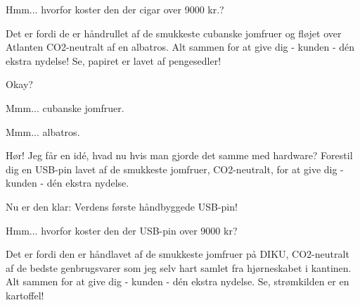 \documentclass[a4paper,11pt]{article}
\begin{document}
\begin{sketch}


 Hmm... hvorfor koster den der cigar over 9000 kr.?

  Det er fordi de er håndrullet af de smukkeste cubanske jomfruer og fløjet over Atlanten CO2-neutralt af en albatros.  Alt sammen for at give dig - kunden - d\'en ekstra nydelse! Se, papiret er lavet af pengesedler!


 Okay?


 Mmm... cubanske jomfruer.


 Mmm... albatros.


  Hør! Jeg får en id\'e,  hvad nu hvis man gjorde det samme med hardware?
 Forestil dig en USB-pin lavet af de smukkeste jomfruer, CO2-neutralt, for at give dig - kunden - d\'en ekstra nydelse.


  Nu er den klar: Verdens første håndbyggede USB-pin!



 Hmm... hvorfor koster den der USB-pin over 9000 kr?

  Det er fordi den er håndlavet af de smukkeste jomfruer på DIKU, CO2-neutralt af de bedste genbrugsvarer som jeg selv hart samlet fra hjørneskabet i kantinen. Alt sammen for at give dig - kunden - d\'en ekstra nydelse. Se, strømkilden er en kartoffel!


\end{sketch}
\end{document}

